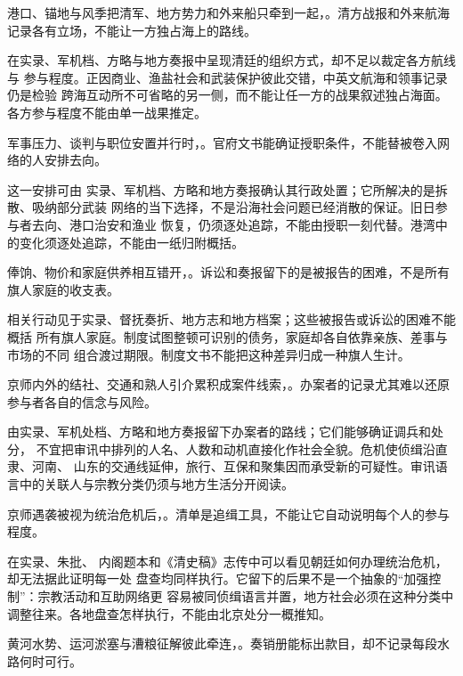 港口、锚地与风季把清军、地方势力和外来船只牵到一起，。清方战报和外来航海记录各有立场，不能让一方独占海上的路线。


在实录、军机档、方略与地方奏报中呈现清廷的组织方式，却不足以裁定各方航线与
参与程度。正因商业、渔盐社会和武装保护彼此交错，中英文航海和领事记录仍是检验
跨海互动所不可省略的另一侧，而不能让任一方的战果叙述独占海面。各方参与程度不能由单一战果推定。

军事压力、谈判与职位安置并行时，。官府文书能确证授职条件，不能替被卷入网络的人安排去向。

这一安排可由
实录、军机档、方略和地方奏报确认其行政处置；它所解决的是拆散、吸纳部分武装
网络的当下选择，不是沿海社会问题已经消散的保证。旧日参与者去向、港口治安和渔业
恢复，仍须逐处追踪，不能由授职一刻代替。港湾中的变化须逐处追踪，不能由一纸归附概括。

俸饷、物价和家庭供养相互错开，。诉讼和奏报留下的是被报告的困难，不是所有旗人家庭的收支表。

相关行动见于实录、督抚奏折、地方志和地方档案；这些被报告或诉讼的困难不能概括
所有旗人家庭。制度试图整顿可识别的债务，家庭却各自依靠亲族、差事与市场的不同
组合渡过期限。制度文书不能把这种差异归成一种旗人生计。

京师内外的结社、交通和熟人引介累积成案件线索，。办案者的记录尤其难以还原参与者各自的信念与风险。


由实录、军机处档、方略和地方奏报留下办案者的路线；它们能够确证调兵和处分，
不宜把审讯中排列的人名、人数和动机直接化作社会全貌。危机使侦缉沿直隶、河南、
山东的交通线延伸，旅行、互保和聚集因而承受新的可疑性。审讯语言中的关联人与宗教分类仍须与地方生活分开阅读。

京师遇袭被视为统治危机后，。清单是追缉工具，不能让它自动说明每个人的参与程度。

在实录、朱批、
内阁题本和《清史稿》志传中可以看见朝廷如何办理统治危机，却无法据此证明每一处
盘查均同样执行。它留下的后果不是一个抽象的“加强控制”：宗教活动和互助网络更
容易被同侦缉语言并置，地方社会必须在这种分类中调整往来。各地盘查怎样执行，不能由北京处分一概推知。

黄河水势、运河淤塞与漕粮征解彼此牵连，。奏销册能标出款目，却不记录每段水路何时可行。


